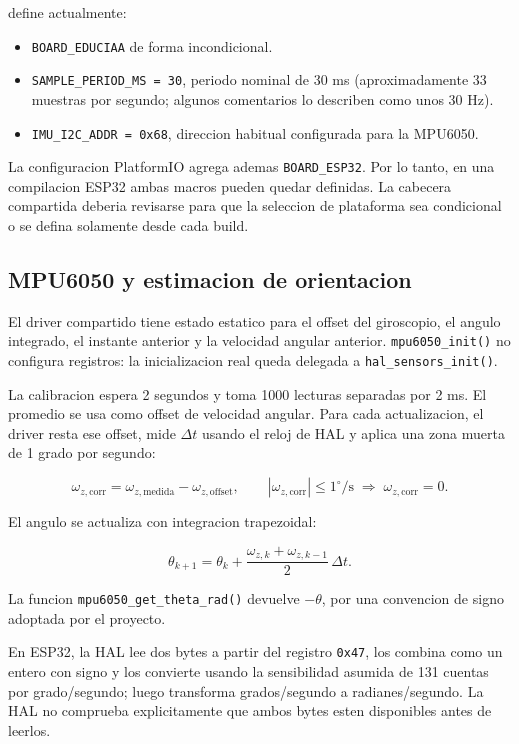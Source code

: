 \documentclass[11pt,a4paper]{article}
\newcommand{\ruta}[1]{\path{#1}}
\begin{document}
\ruta{shared/config/config.h} define actualmente:

\begin{itemize}
  \item \texttt{BOARD\_EDUCIAA} de forma incondicional.
  \item \texttt{SAMPLE\_PERIOD\_MS = 30}, periodo nominal de 30 ms (aproximadamente 33 muestras por segundo; algunos comentarios lo describen como unos 30 Hz).
  \item \texttt{IMU\_I2C\_ADDR = 0x68}, direccion habitual configurada para la MPU6050.
\end{itemize}

La configuracion PlatformIO agrega ademas \texttt{BOARD\_ESP32}. Por lo tanto, en una compilacion ESP32 ambas macros pueden quedar definidas. La cabecera compartida deberia revisarse para que la seleccion de plataforma sea condicional o se defina solamente desde cada build.

\subsection{MPU6050 y estimacion de orientacion}

El driver compartido tiene estado estatico para el offset del giroscopio, el angulo integrado, el instante anterior y la velocidad angular anterior. \texttt{mpu6050\_init()} no configura registros: la inicializacion real queda delegada a \texttt{hal\_sensors\_init()}.

La calibracion espera 2 segundos y toma 1000 lecturas separadas por 2 ms. El promedio se usa como offset de velocidad angular. Para cada actualizacion, el driver resta ese offset, mide \(\Delta t\) usando el reloj de HAL y aplica una zona muerta de 1 grado por segundo:

\[
\omega_{z,\mathrm{corr}} = \omega_{z,\mathrm{medida}} - \omega_{z,\mathrm{offset}},
\qquad
|\omega_{z,\mathrm{corr}}| \leq 1^\circ/\mathrm{s}
\;\Longrightarrow\;
\omega_{z,\mathrm{corr}} = 0.
\]

El angulo se actualiza con integracion trapezoidal:

\[
\theta_{k+1} = \theta_k +
\frac{\omega_{z,k}+\omega_{z,k-1}}{2}\,\Delta t.
\]

La funcion \texttt{mpu6050\_get\_theta\_rad()} devuelve \(-\theta\), por una convencion de signo adoptada por el proyecto.

En ESP32, la HAL lee dos bytes a partir del registro \texttt{0x47}, los combina como un entero con signo y los convierte usando la sensibilidad asumida de 131 cuentas por grado/segundo; luego transforma grados/segundo a radianes/segundo. La HAL no comprueba explicitamente que ambos bytes esten disponibles antes de leerlos.
\end{document}

